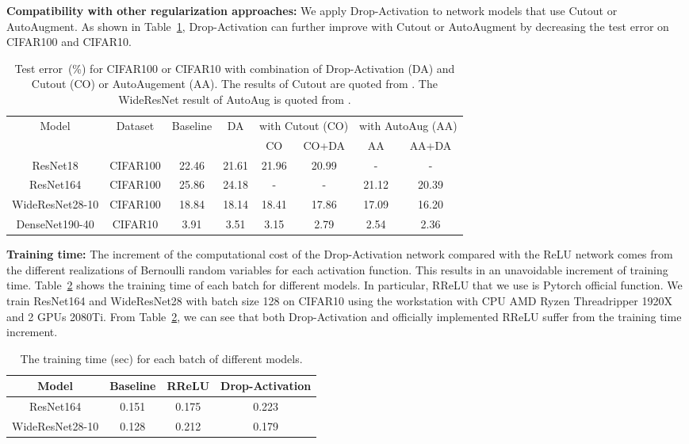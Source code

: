 \documentclass[11pt]{article}
\begin{document}
\textbf{Compatibility with other regularization approaches:} We apply Drop-Activation to network models that use Cutout or AutoAugment. As shown in Table~\ref{tab:combination}, Drop-Activation can further improve with Cutout or AutoAugment by decreasing the test error on CIFAR100 and CIFAR10.
\begin{table}[htbp]
\small
  \centering
  
   \begin{tabular}{|c|c|c|c|c|c|c|c|}
    \toprule
    \multirow{2}[4]{*}{Model} & \multirow{2}[4]{*}{Dataset} & \multirow{2}[4]{*}{Baseline} & \multirow{2}[4]{*}{DA} & \multicolumn{2}{c|}{with Cutout (CO)} & \multicolumn{2}{c|}{with AutoAug (AA)} \\
\cmidrule{5-8}          &       &       &       & CO    & CO+DA & AA    & AA+DA \\
    \midrule
    ResNet18 & CIFAR100 & 22.46  &   21.61    & 21.96  & 20.99  & -     & - \\
    ResNet164 & CIFAR100 & 25.86  & 24.18  & -     & -     & 21.12  & 20.39  \\
    WideResNet28-10 & CIFAR100 & 18.84  & 18.14  & 18.41  & 17.86  & 17.09  & 16.20  \\
    \midrule
    DenseNet190-40 & CIFAR10 & 3.91  & 3.51  & 3.15  & 2.79  & 2.54  & 2.36  \\
    \bottomrule
    \end{tabular}

    \caption{Test error~(\%) for CIFAR100 or CIFAR10 with combination of Drop-Activation (DA) and Cutout (CO) or AutoAugement (AA). The results of Cutout are quoted from \cite{cutout}. The WideResNet result of AutoAug is quoted from \cite{autoaugment}.}
  \label{tab:combination}\vspace{-0.5cm}
\end{table}

\textbf{Training time:}
The increment of the computational cost of the Drop-Activation network compared with the ReLU network comes from the different realizations of Bernoulli random variables for each activation function. This results in an unavoidable increment of training time. Table~\ref{tab:trainingtime} shows the training time of each batch for different models. In particular, RReLU that we use is Pytorch official function. We train ResNet164 and WideResNet28 with batch size 128 on CIFAR10 using the workstation with CPU AMD Ryzen Threadripper 1920X and 2 GPUs 2080Ti. From Table~\ref{tab:trainingtime}, we can see that both Drop-Activation and officially implemented RReLU suffer from the training time increment.
\begin{table}[htbp]
\small
  \centering
  
    \begin{tabular}{|c|c|c|c|}
    \toprule
    Model & Baseline & RReLU & Drop-Activation \\
    \midrule
    ResNet164 & 0.151 & 0.175 & 0.223 \\
    WideResNet28-10 & 0.128 & 0.212 & 0.179 \\
    \bottomrule
    \end{tabular}\caption{The training time (sec) for each batch of different models.}
   \label{tab:trainingtime}\end{table}
\end{document}
